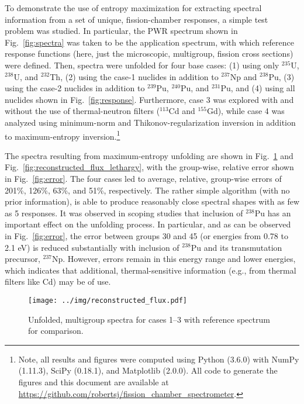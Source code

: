\documentclass[journal]{IEEEtran}
\newcommand{\FIG}[1]{Fig.~\ref{#1}}               %
\begin{document}
To demonstrate the use of entropy maximization for extracting spectral information from a set of unique, fission-chamber responses,  a simple test problem was studied.  In particular, the PWR spectrum shown in \FIG{fig:spectra} was taken to be the application spectrum, with which reference response functions (here, just the microscopic, multigroup, fission cross sections) were defined.  Then, spectra were unfolded for four base cases: (1) using only ${}^{235}$U, ${}^{238}$U, and ${}^{232}$Th, (2) using the case-1 nuclides in addition to ${}^{237}$Np and ${}^{238}$Pu, (3) using the case-2 nuclides in addition to ${}^{239}$Pu, ${}^{240}$Pu, and ${}^{231}$Pu, and (4) using all nuclides shown in \FIG{fig:response}.  Furthermore, case 3 was explored with and without the use of thermal-neutron filters (${}^{113}$Cd and ${}^{155}$Gd), while  case 4 was analyzed using minimum-norm and Thikonov-regularization inversion in addition to maximum-entropy inversion.\footnote{Note, all results and figures were computed using Python (3.6.0) with NumPy (1.11.3), SciPy (0.18.1), and Matplotlib (2.0.0).  All code to generate the figures and this document are available at \url{https://github.com/robertsj/fission_chamber_spectrometer}.}


The spectra resulting from maximum-entropy unfolding are shown in \FIG{fig:reconstructed_flux} and \FIG{fig:reconstructed_flux_lethargy}, with the group-wise, relative error shown in \FIG{fig:error}. The four cases led to average, relative, group-wise errors of 201\%, 126\%, 63\%, and 51\%, respectively.   The rather simple algorithm (with no prior information), is able to produce reasonably close spectral shapes with as few as 5 responses.  It was observed in scoping studies that inclusion of ${}^{238}$Pu has an important effect on the unfolding process.  In particular, and as can be observed in \FIG{fig:error}, the error between groups 30 and 45 (or energies from 0.78 to 2.1 eV) is reduced substantially with inclusion of ${}^{238}$Pu and its transmutation precursor, ${}^{237}$Np.  However, errors remain in this energy range and lower energies, which indicates that additional, thermal-sensitive information (e.g., from thermal filters like Cd) may be of use.

\begin{figure}[h!tb]
  \centering
  \texttt{[image: ../img/reconstructed\_flux.pdf]}
  \caption{Unfolded, multigroup spectra for cases 1--3 with reference spectrum for comparison.}
  \label{fig:reconstructed_flux}
\end{figure}
\end{document}
